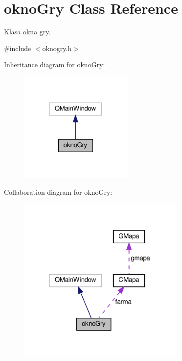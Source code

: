 \hypertarget{classokno_gry}{}\section{okno\+Gry Class Reference}
\label{classokno_gry}


Klasa okna gry.  




{\ttfamily \#include $<$oknogry.\+h$>$}



Inheritance diagram for okno\+Gry\+:\nopagebreak
\begin{figure}[H]
\begin{center}
\leavevmode
\includegraphics[width=160pt]{classokno_gry__inherit__graph}
\end{center}
\end{figure}


Collaboration diagram for okno\+Gry\+:\nopagebreak
\begin{figure}[H]
\begin{center}
\leavevmode
\includegraphics[width=235pt]{classokno_gry__coll__graph}
\end{center}
\end{figure}

